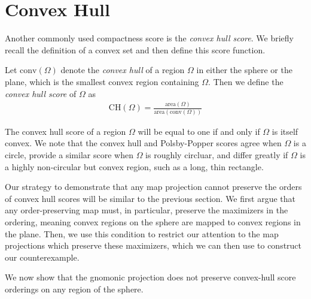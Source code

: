 \section{Convex Hull}\label{sec:ch}
Another commonly used compactness score is the \textit{convex hull
score}.  We briefly recall the definition of a convex set and then
define this score function.

\begin{definition}
  Let $\mathrm{conv}(\Omega)$ denote the \textit{convex hull} of
  a region $\Omega$ in either the sphere or the plane, which is the
  smallest convex region containing $\Omega$.  Then we define the
  \textit{convex hull score} of $\Omega$ as 
  \begin{align*}
    \mathrm{CH}(\Omega)=
    \frac{\mathrm{area}(\Omega)}{\mathrm{area}(\mathrm{conv}(\Omega))}
  \end{align*}
\end{definition}

The convex hull score of a region $\Omega$  will be equal to one if
and only if $\Omega$ is itself convex.  We note that the convex hull
and Polsby-Popper scores agree when $\Omega$ is a circle, provide
a similar score when $\Omega$ is roughly circluar, and differ greatly
if $\Omega$ is a highly non-circular but convex region, such as
a long, thin rectangle.

Our strategy to demonstrate that any map projection cannot preserve
the orders of convex hull scores will be similar to the previous
section. We first argue that any order-preserving map must, in
particular, preserve the maximizers in the ordering, meaning convex
regions on the sphere are mapped to convex regions in the plane.
Then, we use this condition to restrict our attention to the map
projections which preserve these maximizers, which we can then use to
construct our counterexample.


We now show that the gnomonic projection does not preserve 
convex-hull score orderings on any region of the sphere.


